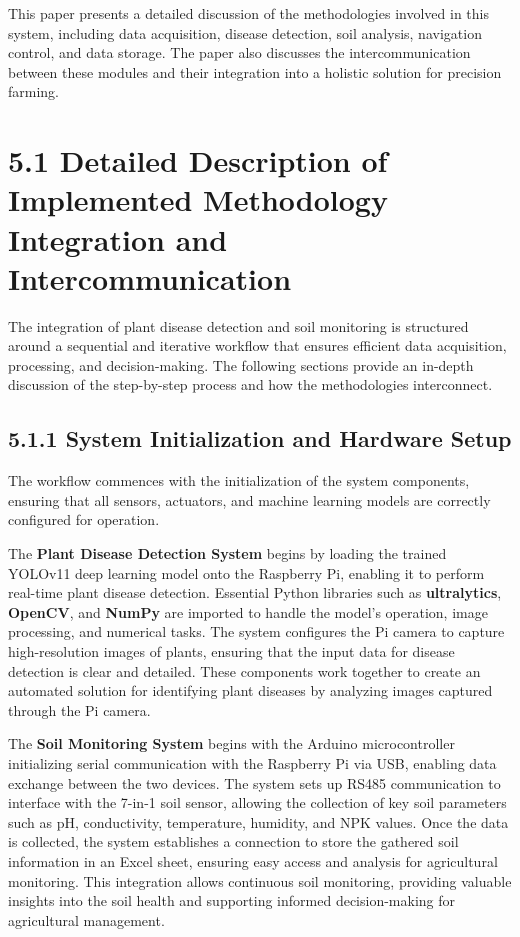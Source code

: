 \documentclass{book} %
\begin{document}
\noindent This paper presents a detailed discussion of the methodologies involved in this system, including data acquisition, disease detection, soil analysis, navigation control, and data storage. The paper also discusses the intercommunication between these modules and their integration into a holistic solution for precision farming.

\noindent 

\noindent 
\chapter{5.1 Detailed Description of Implemented Methodology Integration and Intercommunication}

\noindent The integration of plant disease detection and soil monitoring is structured around a sequential and iterative workflow that ensures efficient data acquisition, processing, and decision-making. The following sections provide an in-depth discussion of the step-by-step process and how the methodologies interconnect.

\noindent 
\section{5.1.1 System Initialization and Hardware Setup}

\noindent The workflow commences with the initialization of the system components, ensuring that all sensors, actuators, and machine learning models are correctly configured for operation.

\noindent \textbf{}

\noindent The \textbf{Plant Disease Detection System} begins by loading the trained YOLOv11 deep learning model onto the Raspberry Pi, enabling it to perform real-time plant disease detection. Essential Python libraries such as \textbf{ultralytics}, \textbf{OpenCV}, and \textbf{NumPy} are imported to handle the model's operation, image processing, and numerical tasks. The system configures the Pi camera to capture high-resolution images of plants, ensuring that the input data for disease detection is clear and detailed. These components work together to create an automated solution for identifying plant diseases by analyzing images captured through the Pi camera.

\noindent \textbf{}

\noindent The \textbf{Soil Monitoring System} begins with the Arduino microcontroller initializing serial communication with the Raspberry Pi via USB, enabling data exchange between the two devices. The system sets up RS485 communication to interface with the 7-in-1 soil sensor, allowing the collection of key soil parameters such as pH, conductivity, temperature, humidity, and NPK values. Once the data is collected, the system establishes a connection to store the gathered soil information in an Excel sheet, ensuring easy access and analysis for agricultural monitoring. This integration allows continuous soil monitoring, providing valuable insights into the soil health and supporting informed decision-making for agricultural management.
\end{document}
